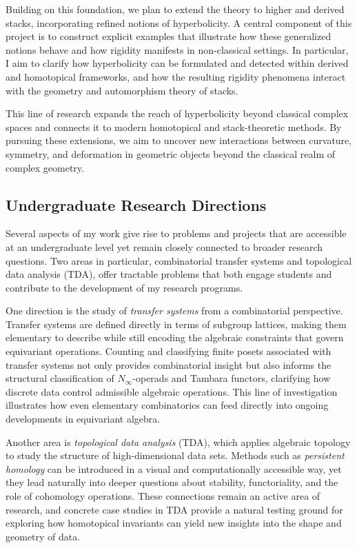 \documentclass[11pt]{article}
\begin{document}
Building on this foundation, we plan to extend the theory to higher and derived stacks, incorporating refined notions of hyperbolicity.
A central component of this project is to construct explicit examples that illustrate how these generalized notions behave and how rigidity manifests in non-classical settings.
In particular, I aim to clarify how hyperbolicity can be formulated and detected within derived and homotopical frameworks, and how the resulting rigidity phenomena interact with the geometry and automorphism theory of stacks.

This line of research expands the reach of hyperbolicity beyond classical complex spaces and connects it to modern homotopical and stack-theoretic methods.
By pursuing these extensions, we aim to uncover new interactions between curvature, symmetry, and deformation in geometric objects beyond the classical realm of complex geometry.

\subsection*{Undergraduate Research Directions}
Several aspects of my work give rise to problems and projects that are accessible at an undergraduate level yet remain closely connected to broader research questions.
Two areas in particular, combinatorial transfer systems and topological data analysis (TDA), offer tractable problems that both engage students and contribute to the development of my research programs.

One direction is the study of {\it transfer systems} from a combinatorial perspective.
Transfer systems are defined directly in terms of subgroup lattices, making them elementary to describe while still encoding the algebraic constraints that govern equivariant operations.
Counting and classifying finite posets associated with transfer systems not only provides combinatorial insight but also informs the structural classification of $N_\infty$-operads and Tambara functors, clarifying how discrete data control admissible algebraic operations.
This line of investigation illustrates how even elementary combinatorics can feed directly into ongoing developments in equivariant algebra.

Another area is {\it topological data analysis} (TDA), which applies algebraic topology to study the structure of high-dimensional data sets.
Methods such as {\it persistent homology} can be introduced in a visual and computationally accessible way, yet they lead naturally into deeper questions about stability, functoriality, and the role of cohomology operations.
These connections remain an active area of research, and concrete case studies in TDA provide a natural testing ground for exploring how homotopical invariants can yield new insights into the shape and geometry of data.
\end{document}
